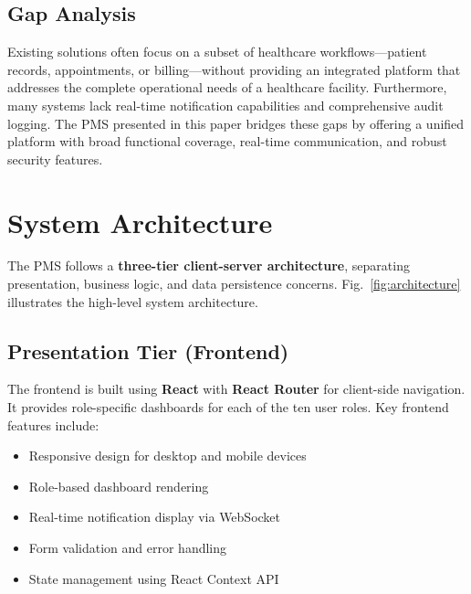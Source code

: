 \documentclass[conference]{IEEEtran}
\begin{document}
\subsection{Gap Analysis}
Existing solutions often focus on a subset of healthcare workflows---patient records, appointments, or billing---without providing an integrated platform that addresses the complete operational needs of a healthcare facility. Furthermore, many systems lack real-time notification capabilities and comprehensive audit logging. The PMS presented in this paper bridges these gaps by offering a unified platform with broad functional coverage, real-time communication, and robust security features.

\section{System Architecture}

The PMS follows a \textbf{three-tier client-server architecture}, separating presentation, business logic, and data persistence concerns. Fig.~\ref{fig:architecture} illustrates the high-level system architecture.

\subsection{Presentation Tier (Frontend)}
The frontend is built using \textbf{React} with \textbf{React Router} for client-side navigation. It provides role-specific dashboards for each of the ten user roles. Key frontend features include:
\begin{itemize}[leftmargin=*]
  \item Responsive design for desktop and mobile devices
  \item Role-based dashboard rendering
  \item Real-time notification display via WebSocket
  \item Form validation and error handling
  \item State management using React Context API
\end{itemize}
\end{document}
